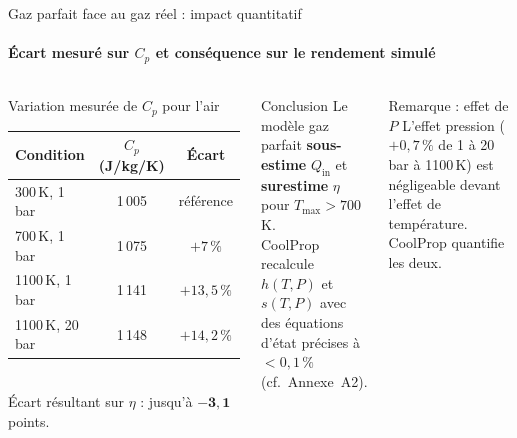\documentclass[aspectratio=43, 10pt]{beamer}
\newcommand{\Tmax}{T_{\max}}
\newcommand{\Qin}{Q_{\text{in}}}
\begin{document}
\begin{frame}{Gaz parfait face au gaz r\'eel : impact quantitatif}
  \framesubtitle{\'Ecart mesur\'e sur $C_p$ et cons\'equence sur le rendement simul\'e}

  \begin{columns}[T,onlytextwidth]
      \begin{alertblock}{Variation mesur\'ee de $C_p$ pour l'air}
        \small
        \renewcommand{\arraystretch}{1.2}
        \begin{tabular}{lcc}
          \toprule
          Condition & $C_p$ (J/kg/K) & \'Ecart \\
          \midrule
          300\,K, 1\,bar   & 1\,005 & r\'ef\'erence \\
          700\,K, 1\,bar   & 1\,075 & $+7\,\%$  \\
          1100\,K, 1\,bar  & 1\,141 & $+13{,}5\,\%$ \\
          1100\,K, 20\,bar & 1\,148 & $+14{,}2\,\%$ \\
          \bottomrule
        \end{tabular}\\[6pt]
        \'Ecart r\'esultant sur $\eta$ : jusqu'\`a $\mathbf{-3{,}1}$ points.
      \end{alertblock}

      \begin{exampleblock}{Conclusion}
        \small
        Le mod\`ele gaz parfait \textbf{sous-estime} $\Qin$
        et \textbf{surestime} $\eta$ pour $\Tmax > 700$\,K.\\[6pt]
        CoolProp recalcule $h(T,P)$ et $s(T,P)$ avec
        des \'equations d'\'etat pr\'ecises \`a $< 0{,}1\,\%$
        (cf.~Annexe~A2).
      \end{exampleblock}

      \vspace{0.3em}
      \begin{block}{Remarque : effet de $P$}
        \small
        L'effet pression ($+0{,}7\,\%$ de 1 \`a 20\,bar
        \`a 1100\,K) est n\'egligeable devant l'effet
        de temp\'erature. CoolProp quantifie les deux.
      \end{block}
  \end{columns}

\end{frame}
\end{document}

